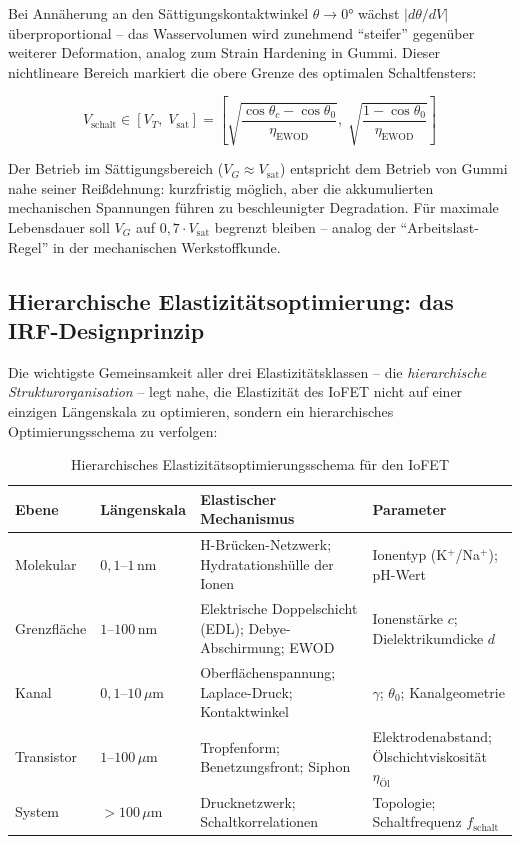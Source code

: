 ﻿\documentclass[a4paper,12pt]{scrreprt}
\theoremstyle{definition}
\begin{document}
Bei Annäherung an den Sättigungskontaktwinkel $\theta \to 0 °$ wächst
$|d\theta/dV|$ überproportional -- das Wasservolumen wird zunehmend
``steifer'' gegenüber weiterer Deformation, analog zum Strain Hardening
in Gummi. Dieser nichtlineare Bereich markiert die obere Grenze des
optimalen Schaltfensters:

\begin{equation}
	V_{\mathrm{schalt}} \in \left[V_T, \; V_{\mathrm{sat}}\right]
	= \left[\sqrt{\frac{\cos\theta_c - \cos\theta_0}{\eta_{\mathrm{EWOD}}}},\;
	\sqrt{\frac{1 - \cos\theta_0}{\eta_{\mathrm{EWOD}}}}\right]
	\label{eq:schaltfenster}
\end{equation}

Der Betrieb im Sättigungsbereich ($V_G \approx V_{\mathrm{sat}}$) entspricht
dem Betrieb von Gummi nahe seiner Reißdehnung: kurzfristig möglich,
aber die akkumulierten mechanischen Spannungen führen zu beschleunigter
Degradation. Für maximale Lebensdauer soll $V_G$ auf $0{,}7 \cdot V_{\mathrm{sat}}$
begrenzt bleiben -- analog der ``Arbeitslast-Regel'' in der mechanischen
Werkstoffkunde.

\subsection{Hierarchische Elastizitätsoptimierung: das IRF-Designprinzip}

Die wichtigste Gemeinsamkeit aller drei Elastizitätsklassen -- die
\emph{hierarchische Strukturorganisation} -- legt nahe, die Elastizität
des IoFET nicht auf einer einzigen Längenskala zu optimieren, sondern
ein hierarchisches Optimierungsschema zu verfolgen:

\begin{table}[H]
	\centering
	\caption{Hierarchisches Elastizitätsoptimierungsschema für den IoFET}
	\label{tab:hierarchie_elast}
	\begin{tabular}{p{2.2cm}p{3.5cm}p{4.5cm}p{3.5cm}}
		\toprule
		\textbf{Ebene} & \textbf{Längenskala} & \textbf{Elastischer Mechanismus} & \textbf{Parameter} \\
		\midrule
		Molekular  & $0{,}1$--$1\,\mathrm{nm}$ & H-Brücken-Netzwerk; Hydratationshülle der Ionen & Ionentyp (K$^+$/Na$^+$); pH-Wert \\
		\midrule
		Grenzfläche & $1$--$100\,\mathrm{nm}$ & Elektrische Doppelschicht (EDL); Debye-Abschirmung; EWOD & Ionenstärke $c$; Dielektrikumdicke $d$ \\
		\midrule
		Kanal & $0{,}1$--$10\,\mu\mathrm{m}$ & Oberflächenspannung; Laplace-Druck; Kontaktwinkel & $\gamma$; $\theta_0$; Kanalgeometrie \\
		\midrule
		Transistor & $1$--$100\,\mu\mathrm{m}$ & Tropfenform; Benetzungsfront; Siphon & Elektrodenabstand; Ölschichtviskosität $\eta_{\mathrm{Öl}}$ \\
		\midrule
		System & $>100\,\mu\mathrm{m}$ & Drucknetzwerk; Schaltkorrelationen & Topologie; Schaltfrequenz $f_{\mathrm{schalt}}$ \\
		\bottomrule
	\end{tabular}
\end{table}
\end{document}
